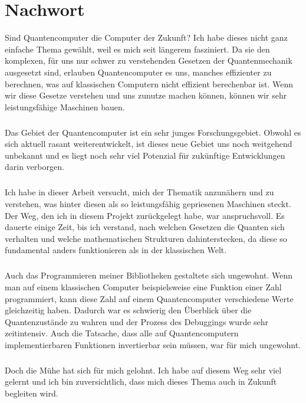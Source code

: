 \chapter{Nachwort}
Sind Quantencomputer die Computer der Zukunft? Ich habe dieses nicht ganz einfache Thema gewählt, weil es mich seit längerem fasziniert. Da sie den komplexen, für uns nur schwer zu verstehenden Gesetzen der Quantenmechanik ausgesetzt sind, erlauben Quantencomputer es uns, manches effizienter zu berechnen, was auf klassischen Computern nicht effizient berechenbar ist.  Wenn wir diese Gesetze verstehen und uns zunutze machen können, können wir sehr leistungsfähige Maschinen bauen.
\paragraph{} 
\noindent Das Gebiet der Quantencomputer ist ein sehr junges Forschungsgebiet. Obwohl es sich aktuell rasant weiterentwickelt, ist dieses neue Gebiet uns noch weitgehend unbekannt und es liegt noch sehr viel Potenzial für zukünftige Entwicklungen darin verborgen.
\paragraph{}
\noindent Ich habe in dieser Arbeit versucht, mich der Thematik anzunähern und zu verstehen, was hinter diesen als so leistungsfähig gepriesenen Maschinen steckt. Der Weg, den ich in diesem Projekt zurückgelegt habe, war anspruchsvoll. Es dauerte einige Zeit, bis ich verstand, nach welchen Gesetzen die Quanten sich verhalten und welche mathematischen Strukturen dahinterstecken, da diese so fundamental anders funktionieren als in der klassischen Welt.
\paragraph{}
\noindent Auch das Programmieren meiner Bibliotheken gestaltete sich ungewohnt. Wenn man auf einem klassischen Computer beispielsweise eine Funktion einer Zahl programmiert,  kann diese Zahl auf einem Quantencomputer verschiedene Werte gleichzeitig haben. Dadurch war es schwierig den Überblick über die Quantenzustände zu wahren und der Prozess des Debuggings wurde sehr zeitintensiv. Auch die Tatsache, dass alle auf Quantencomputern implementierbaren Funktionen invertierbar sein müssen, war für mich ungewohnt. 
\paragraph{}
\noindent Doch die Mühe hat sich für mich gelohnt. Ich habe auf diesem Weg sehr viel gelernt und ich bin zuversichtlich, dass mich dieses Thema auch in Zukunft begleiten wird.
